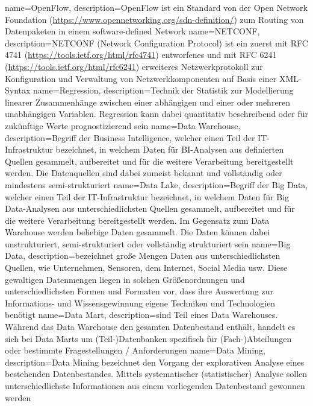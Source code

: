 {
    name=OpenFlow,
    description={OpenFlow ist ein Standard von der Open Network Foundation (\url{https://www.opennetworking.org/sdn-definition/}) zum Routing von Datenpaketen in einem software-defined Network}
}
{
    name=NETCONF,
    description={NETCONF (Network Configuration Protocol) ist ein zuerst mit RFC 4741 (\url{https://tools.ietf.org/html/rfc4741}) entworfenes und mit RFC 6241 (\url{https://tools.ietf.org/html/rfc6241}) erweiteres Netzwerkprotokoll zur Konfiguration und Verwaltung von Netzwerkkomponenten auf Basis einer XML-Syntax}
}
{
    name=Regression,
    description={Technik der Statistik zur Modellierung linearer Zusammenhänge zwischen einer abhängigen und einer oder mehreren unabhängigen Variablen. Regression kann dabei quantitativ beschreibend oder für zukünftige Werte prognostizierend sein}
}
{
    name=Data Warehouse,
    description={Begriff der Business Intelligence, welcher einen Teil der IT-Infrastruktur bezeichnet, in welchem Daten für BI-Analysen aus definierten Quellen gesammelt, aufbereitet und für die weitere Verarbeitung bereitgestellt werden. Die Datenquellen sind dabei zumeist bekannt und vollständig oder mindestens semi-strukturiert}
}
{
    name=Data Lake,
    description={Begriff der Big Data, welcher einen Teil der IT-Infrastruktur bezeichnet, in welchem Daten für Big Data-Analysen aus unterschiedlichsten Quellen gesammelt, aufbereitet und für die weitere Verarbeitung bereitgestellt werden. Im Gegensatz zum Data Warehouse werden beliebige Daten gesammelt. Die Daten können dabei unstrukturiert, semi-strukturiert oder vollständig strukturiert sein}
}
{
    name=Big Data,
    description={bezeichnet große Mengen Daten aus unterschiedlichsten Quellen, wie Unternehmen, Sensoren, dem Internet, Social Media usw. Diese gewaltigen Datenmengen liegen in solchen Größenordnungen und unterschiedlichsten Formen und Formaten vor, dass ihre Auswertung zur Informations- und Wissensgewinnung eigene Techniken und Technologien benötigt}
}
{
    name=Data Mart,
    description={sind Teil eines Data Warehouses. Während das Data Warehouse den gesamten Datenbestand enthält, handelt es sich bei Data Marts um (Teil-)Datenbanken spezifisch für (Fach-)Abteilungen oder bestimmte Fragestellungen / Anforderungen}
}
{
    name=Data Mining,
    description={Data Mining bezeichnet den Vorgang der explorativen Analyse eines bestehenden Datenbestandes. Mittels systematischer (statistischer) Analyse sollen unterschiedlichste Informationen aus einem vorliegenden Datenbestand gewonnen werden}
}
